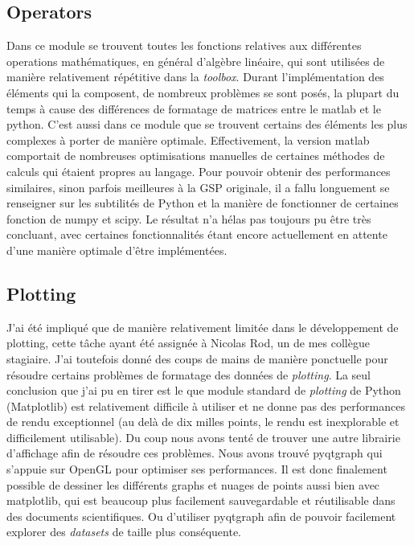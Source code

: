 \subsection*{Operators}

Dans ce module se trouvent toutes les fonctions relatives aux différentes operations mathématiques, en général d'algèbre linéaire, qui sont utilisées de manière relativement répétitive dans la \emph{toolbox}.
Durant l'implémentation des éléments qui la composent, de nombreux problèmes se sont posés, la plupart du temps à cause des différences de formatage de matrices entre le matlab et le python. C'est aussi dans ce module que se trouvent certains des éléments les plus complexes à porter de manière optimale. Effectivement, la version matlab comportait de nombreuses optimisations manuelles de certaines méthodes de calculs qui étaient propres au langage. Pour pouvoir obtenir des performances similaires, sinon parfois meilleures à la GSP originale, il a fallu longuement se renseigner sur les subtilités de Python et la manière de fonctionner de certaines fonction de numpy et scipy.
Le résultat n'a hélas pas toujours pu être très concluant, avec certaines fonctionnalités étant encore actuellement en attente d'une manière optimale d'être implémentées.

\subsection*{Plotting}

J'ai été impliqué que de manière relativement limitée dans le développement de plotting, cette tâche ayant été assignée à Nicolas Rod, un de mes collègue stagiaire. J'ai toutefois donné des coups de mains de manière ponctuelle pour résoudre certains problèmes de formatage des données de \emph{plotting}. La seul conclusion que j'ai pu en tirer est le que module standard de \emph{plotting} de Python (Matplotlib) est relativement difficile à utiliser et ne donne pas des performances de rendu exceptionnel (au delà de dix milles points, le rendu est inexplorable et difficilement utilisable).
Du coup nous avons tenté de trouver une autre librairie d'affichage afin de résoudre ces problèmes. Nous avons trouvé pyqtgraph qui s'appuie sur OpenGL pour optimiser ses performances. Il est donc finalement possible de dessiner les différents graphs et nuages de points aussi bien avec matplotlib, qui est beaucoup plus facilement sauvegardable et réutilisable dans des documents scientifiques. Ou d'utiliser pyqtgraph afin de pouvoir facilement explorer des \emph{datasets} de taille plus conséquente.

